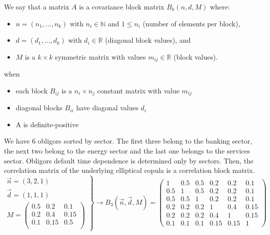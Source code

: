 \documentclass[11pt,fleqn]{book} %
\begin{document}
\begin{definition}
	We say that a matrix $A$ is a covariance block matrix $B_k(n,d,M)$ where:
	\begin{itemize}
		\item $n=(n_1,\dots,n_k)$ with $n_i \in \mathbb{N}$ and $1 \le n_i$ (number of elements per block),
		\item $d=(d_1,\dots,d_k)$ with $d_i \in \mathbb{R}$ (diagonal block values), and
		\item $M$ is a $k {\times} k$ symmetric matrix with values $m_{ij} \in \mathbb{R}$ (block values).
	\end{itemize}
	when
	\begin{itemize}
		\item each block $B_{ij}$ is a $n_i {\times} n_j$ constant matrix with value $m_{ij}$
		\item diagonal blocks $B_{ii}$ have diagonal values $d_i$
		\item A is definite-positive
	\end{itemize}
\end{definition}

\begin{example}
	\label{example1}
	We have $6$ obligors sorted by sector. The first three belong to the 
	banking sector, the next two belong to the energy sector 
	and the last one belongs to the services sector. Obligors default time
	dependence is determined only by sectors. Then, the correlation matrix 
	of the underlying elliptical copula is a correlation block matrix.
	\small
	\begin{displaymath}
		\left.
		\begin{array}{l}
			\vec{n} = \left(3,2,1\right) \\
			\vec{d} = \left(1,1,1\right) \\
			M = \left(
			\begin{array}{ccc}
				0.5 & 0.2  & 0.1  \\
				0.2 & 0.4  & 0.15 \\
				0.1 & 0.15 & 0.5  \\
			\end{array}
			\right)
		\end{array}
		\right\}
		\rightarrow
		B_3(\vec{n},\vec{d},M)=
		\left(
		\begin{array}{ccc|cc|c} 
			1   & 0.5 & 0.5 & 0.2  & 0.2  & 0.1  \\ 
			0.5 & 1   & 0.5 & 0.2  & 0.2  & 0.1  \\ 
			0.5 & 0.5 & 1   & 0.2  & 0.2  & 0.1  \\ 
			\hline
			0.2 & 0.2 & 0.2 & 1    & 0.4  & 0.15 \\ 
			0.2 & 0.2 & 0.2 & 0.4  & 1    & 0.15 \\ 
			\hline
			0.1 & 0.1 & 0.1 & 0.15 & 0.15 & 1    
		\end{array} 
		\right)
	\end{displaymath}
\end{example}
\end{document}
